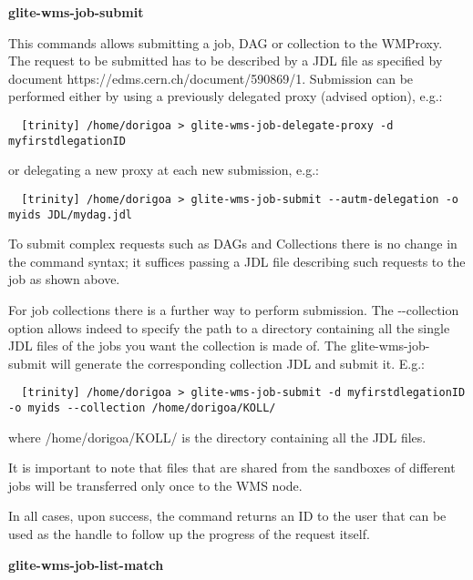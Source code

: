 \textbf{glite-wms-job-submit}

  This commands allows submitting a job, DAG or collection to the WMProxy. The request to be submitted
  has to be described by a JDL file as specified by document https://edms.cern.ch/document/590869/1.
  Submission can be performed either by using a previously delegated proxy (advised option), e.g.:
\begin{scriptsize}
\begin{verbatim}
  [trinity] /home/dorigoa > glite-wms-job-delegate-proxy -d myfirstdlegationID
\end{verbatim}
\end{scriptsize}
  or delegating a new proxy at each new submission, e.g.:
\begin{scriptsize}
\begin{verbatim}
  [trinity] /home/dorigoa > glite-wms-job-submit --autm-delegation -o myids JDL/mydag.jdl
\end{verbatim}
\end{scriptsize}
  To submit complex requests such as DAGs and Collections there is no change in the command syntax; it 
  suffices passing a JDL file describing such requests to the job as shown above.

  For job collections there is a further way to perform submission. The -{}-collection  option allows indeed to
  specify the path to a directory containing all the single JDL files of the jobs you want the collection is 
  made of. The glite-wms-job-submit will generate the corresponding collection JDL and submit it. E.g.:
\begin{scriptsize}
\begin{verbatim}
  [trinity] /home/dorigoa > glite-wms-job-submit -d myfirstdlegationID -o myids --collection /home/dorigoa/KOLL/
\end{verbatim}
\end{scriptsize}
  where /home/dorigoa/KOLL/ is the directory containing all the JDL files.

  It is important to note that files that are shared from the sandboxes of different jobs will be transferred 
  only once to the WMS node.

  In all cases, upon success, the command returns an ID to the user that can be used as the handle to follow 
  up the progress of the request itself.


\textbf{glite-wms-job-list-match}

